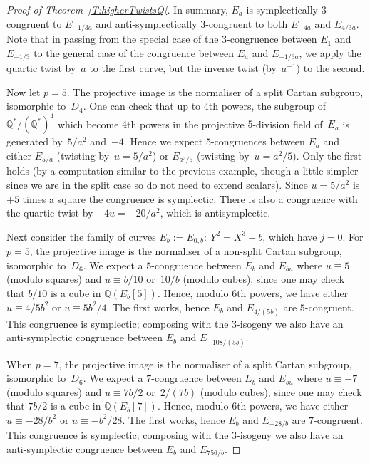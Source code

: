 \documentclass[12pt, reqno]{amsart}
\newcommand{\Q}{\mathbb{Q}}
\newcommand{\Z}{\mathbb{Z}}
\numberwithin{equation}{section}
\theoremstyle{definition}
\theoremstyle{remark}
\begin{document}
\begin{proof}[Proof of Theorem~\ref{T:higherTwistsQ}]
In summary, $E_a$ is symplectically $3$-congruent to $E_{-1/3a}$ and
anti-symplectically $3$-congruent to both $E_{-4a}$ and $E_{4/3a}$.
Note that in passing from the special case of the $3$-congruence
between $E_1$ and $E_{-1/3}$ to the general case of the congruence
between $E_{a}$ and $E_{-1/3a}$, we apply the quartic twist by~$a$ to
the first curve, but the inverse twist (by~$a^{-1}$) to the second.

Now let $p=5$.  The projective image is the normaliser of a split
Cartan subgroup, isomorphic to~$D_4$.  One can check that up to $4$th powers,
the subgroup of $\Q^*/(\Q^*)^4$ which become $4$th powers in the
projective $5$-division field of~$E_a$ is generated by~$5/a^2$
and~$-4$.  Hence we expect $5$-congruences between $E_a$ and either
$E_{5/a}$ (twisting by~$u=5/a^2$) or $E_{a^3/5}$ (twisting
by~$u=a^2/5$).  Only the first holds (by a computation similar to the
previous example, though a little simpler since we are in the split
case so do not need to extend scalars).  Since $u=5/a^2$ is $+5$ times
a square the congruence is symplectic.  There is also a congruence
with the quartic twist by $-4u=-20/a^2$, which is antisymplectic.

Next consider the family of curves $E_b:=E_{0,b}:\ Y^2=X^3+b$, which
have $j=0$. For $p=5$, the projective image is the normaliser of a
non-split Cartan subgroup, isomorphic to~$D_6$.  We expect a $5$-congruence
between $E_b$ and $E_{bu}$ where $u\equiv5$ (modulo squares) and
$u\equiv b/10$ or~$10/b$ (modulo cubes), since one may check that
$b/10$ is a cube in $\Q(E_b[5])$.  Hence, modulo $6$th powers, we have
either $u\equiv 4/5b^2$ or $u\equiv 5b^2/4$.  The first works, hence
$E_b$ and $E_{4/(5b)}$ are $5$-congruent.  This congruence is
symplectic; composing with the $3$-isogeny we also have an
anti-symplectic congruence between $E_b$ and $E_{-108/(5b)}$.

When $p=7$, the projective image is the normaliser of a split Cartan subgroup,
isomorphic to~$D_6$.  We expect a $7$-congruence between $E_b$ and
$E_{bu}$ where $u\equiv-7$ (modulo squares) and $u\equiv 7b/2$
or~$2/(7b)$ (modulo cubes), since one may check that $7b/2$ is a cube
in $\Q(E_b[7])$.  Hence, modulo $6$th powers, we have either $u\equiv
-28/b^2$ or $u\equiv -b^2/28$.  The first works,
  hence $E_b$ and $E_{-28/b}$ are $7$-congruent.  This congruence is
  symplectic; composing with the $3$-isogeny we also have an
  anti-symplectic congruence between $E_b$ and $E_{756/b}$.
\end{proof}
\end{document}
